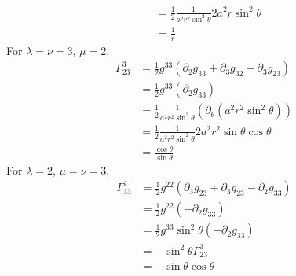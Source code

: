\begin{enumerate}[label=(\alph*)]
\begin{align*}
						& = \frac{1}{2} \frac{1}{a^2 r^2 \sin^2{\theta}} 2a^2 r \sin^2{\theta}\\
						& =  \frac{1}{r}
		\end{align*}		
	For $\lambda=\nu=3$, $\mu=2$,
		\begin{align*}
		\Gamma^3_{23}  	& = \frac{1}{2} g^{33} ( \partial_2 g_{33} + \partial_3 g_{32} - \partial_3 g_{23}) 	\\
						& = \frac{1}{2} g^{33} (\partial_2 g_{33}) \\
						& = \frac{1}{2} \frac{1}{a^2 r^2 \sin^2{\theta}} (\partial_\theta (a^2 r^2 \sin^2{\theta}))\\
						& = \frac{1}{2} \frac{1}{a^2 r^2 \sin^2{\theta}} 2a^2 r^2  \sin{\theta}  \cos{\theta}\\
						& = \frac{\cos{\theta}}{\sin{\theta}}
		\end{align*}		
	For $\lambda=2$, $\mu=\nu=3$,
		\begin{align*}
		\Gamma^2_{33}  	& = \frac{1}{2} g^{22} ( \partial_3 g_{23} + \partial_3 g_{23} - \partial_2 g_{33}) 	\\
						& = \frac{1}{2} g^{22} (- \partial_2 g_{33}) \\
						& = \frac{1}{2} g^{33} \sin^2{\theta} (- \partial_2 g_{33}) \\
						& = -\sin^2{\theta}\Gamma^3_{23} \\
						& = -\sin{\theta}\cos{\theta}
		\end{align*}		
\end{enumerate}

